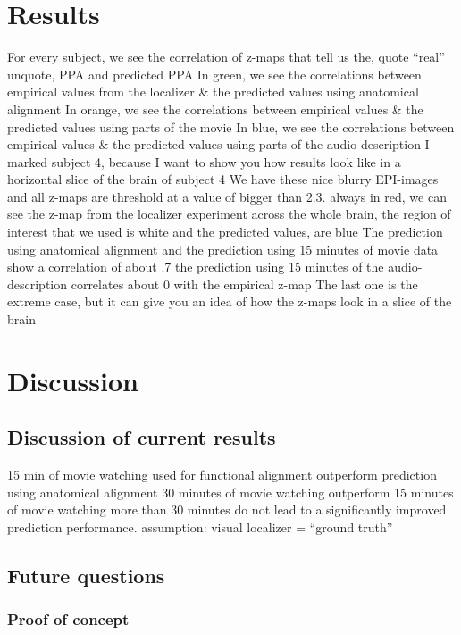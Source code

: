 \section{Results}
%
For every subject, we see the correlation of z-maps that tell us the, quote
``real'' unquote, PPA and predicted PPA
%
In green, we see the correlations between empirical values from the localizer \&
the predicted values using anatomical alignment
%
In orange, we see the correlations between empirical values \& the predicted
values using parts of the movie
%
In blue, we see the correlations between empirical values \& the predicted
values using parts of the audio-description
%
I marked subject 4, because I want to show you how results look like in a
horizontal slice of the brain of subject 4
%
We have these nice blurry EPI-images and all z-maps are threshold at a value of
bigger than 2.3.
%
always in red, we can see the z-map from the localizer experiment across the
whole brain,
%
the region of interest that we used is white and the predicted values, are blue
%
The prediction using anatomical alignment and the prediction using 15 minutes of
movie data show a correlation of about .7
%
the prediction using 15 minutes of the audio-description correlates about 0 with
the empirical z-map
%
The last one is the extreme case, but it can give you an idea of how the z-maps
look in a slice of the brain



\section{Discussion}


\subsection{Discussion of current results}
%
15 min of movie watching used for functional alignment outperform prediction
using anatomical alignment
%
30 minutes of movie watching outperform 15 minutes of movie watching
%
more than 30 minutes do not lead to a significantly improved prediction
performance.
%
assumption: visual localizer = ``ground truth''


\subsection{Future questions}
%

\subsubsection{Proof of concept}
%

